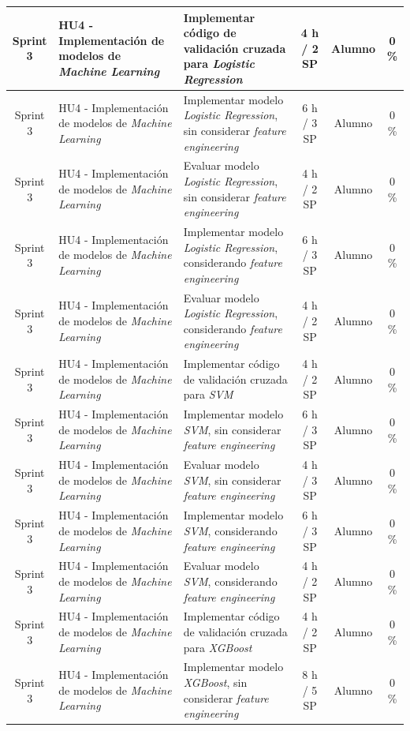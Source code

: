 \documentclass[
11pt, %
]{charter}
\begin{document}
\begin{xltabular}{\linewidth}{@{}|c|X|X|c|c|c|@{}}
Sprint 3 & HU4 - Implementación de modelos de \textit{Machine Learning} & Implementar código de validación cruzada para \textit{Logistic Regression}  & 4 h / 2 SP & Alumno & 0 \% \\ \hline
Sprint 3 & HU4 - Implementación de modelos de \textit{Machine Learning} & Implementar modelo \textit{Logistic Regression}, sin considerar \textit{feature engineering} & 6 h / 3 SP & Alumno & 0 \%\\ \hline
Sprint 3 & HU4 - Implementación de modelos de \textit{Machine Learning} & Evaluar modelo \textit{Logistic Regression}, sin considerar \textit{feature engineering}  & 4 h / 2 SP & Alumno & 0 \%\\ \hline
Sprint 3 & HU4 - Implementación de modelos de \textit{Machine Learning} & Implementar modelo \textit{Logistic Regression}, considerando \textit{feature engineering}  & 6 h / 3 SP & Alumno & 0 \%\\ \hline
Sprint 3 & HU4 - Implementación de modelos de \textit{Machine Learning} & Evaluar modelo \textit{Logistic Regression}, considerando \textit{feature engineering}  & 4 h / 2 SP & Alumno & 0 \%\\ \hline
Sprint 3 & HU4 - Implementación de modelos de \textit{Machine Learning} & Implementar código de validación cruzada para \textit{SVM}  & 4 h / 2 SP & Alumno & 0 \%\\ \hline
Sprint 3 & HU4 - Implementación de modelos de \textit{Machine Learning} & Implementar modelo \textit{SVM}, sin considerar \textit{feature engineering}  & 6 h / 3 SP & Alumno & 0 \%\\ \hline
Sprint 3 & HU4 - Implementación de modelos de \textit{Machine Learning} & Evaluar modelo \textit{SVM}, sin considerar \textit{feature engineering}  & 4 h / 3 SP & Alumno & 0 \%\\ \hline
Sprint 3 & HU4 - Implementación de modelos de \textit{Machine Learning} & Implementar modelo \textit{SVM}, considerando \textit{feature engineering}  & 6 h / 3 SP & Alumno & 0 \%\\ \hline
Sprint 3 & HU4 - Implementación de modelos de \textit{Machine Learning} & Evaluar modelo \textit{SVM}, considerando \textit{feature engineering}  & 4 h / 2 SP & Alumno & 0 \%\\ \hline
Sprint 3 & HU4 - Implementación de modelos de \textit{Machine Learning} & Implementar código de validación cruzada para \textit{XGBoost}  & 4 h / 2 SP & Alumno & 0 \%\\ \hline
Sprint 3 & HU4 - Implementación de modelos de \textit{Machine Learning} & Implementar modelo \textit{XGBoost}, sin considerar \textit{feature engineering}  & 8 h / 5 SP & Alumno & 0 \%\\ \hline

\end{xltabular}
\end{document}
